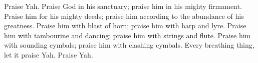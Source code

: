 \begin{biblechapter} %
 Praise Yah. 
Praise God in his sanctuary; 
praise him in his mighty firmament.
\verse Praise him for his mighty deeds; 
praise him according to the abundance of his greatness.
\verse Praise him with blast of horn; 
praise him with harp and lyre.
\verse Praise him with tambourine and dancing; 
praise him with strings and flute.
\verse Praise him with sounding cymbals; 
praise him with clashing cymbals.
\verse Every breathing thing, 
let it praise Yah. 
Praise Yah.
\end{biblechapter}


